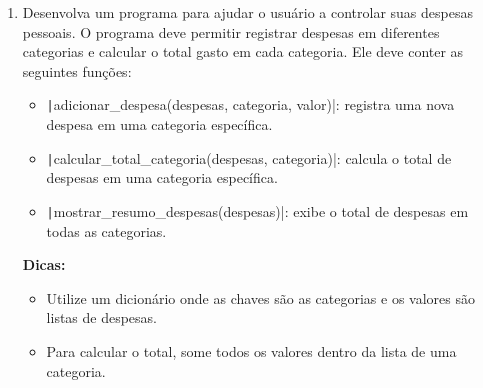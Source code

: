 \documentclass[12pt]{article}
\begin{document}
\begin{enumerate}
  \item Desenvolva um programa para ajudar o usuário a controlar suas despesas pessoais. O programa deve permitir registrar despesas em diferentes categorias e calcular o total gasto em cada categoria. Ele deve conter as seguintes funções:
    \begin{itemize}
      \item \texttt|adicionar_despesa(despesas, categoria, valor)|: registra uma nova despesa em uma categoria específica.
      \item \texttt|calcular_total_categoria(despesas, categoria)|: calcula o total de despesas em uma categoria específica.
      \item \texttt|mostrar_resumo_despesas(despesas)|: exibe o total de despesas em todas as categorias.
    \end{itemize}
    \textbf{Dicas:}
    \begin{itemize}
      \item Utilize um dicionário onde as chaves são as categorias e os valores são listas de despesas.
      \item Para calcular o total, some todos os valores dentro da lista de uma categoria.
    \end{itemize}
\end{enumerate}
\end{document}
